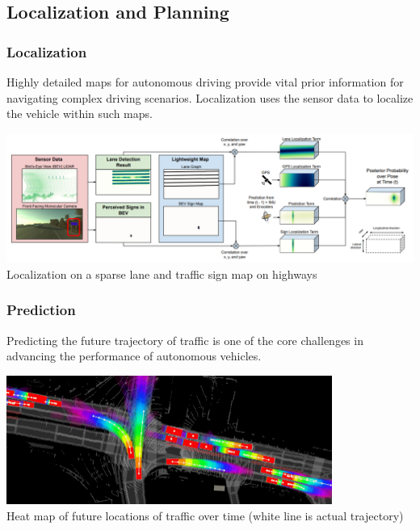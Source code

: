{%

\subsection{Localization and Planning}

\begin{frame}
\frametitle{Localization}
Highly detailed maps for autonomous driving provide vital prior information
for navigating complex driving scenarios. Localization uses the sensor data
to localize the vehicle within such maps.
\begin{center}
\includegraphics[width=\textwidth]{images/uber_sparse_localization.png}\\
\footnotesize{Localization on a sparse lane and traffic sign map on highways \cite{Ma2019}}
\end{center}
\end{frame}

\begin{frame}
\frametitle{Prediction}
Predicting the future trajectory of traffic is one of the core challenges in
advancing the performance of autonomous vehicles.
\begin{center}
\includegraphics[width=0.8\textwidth]{images/uber_prediction.png}\\
\vspace{0.2cm}
\footnotesize{Heat map of future locations of traffic over time
      (white line is actual trajectory) \cite{Casas2020}}
\end{center}
\end{frame}

}

